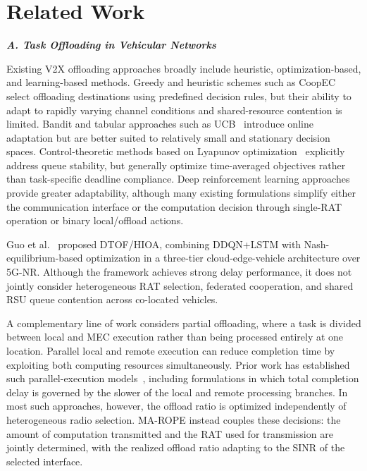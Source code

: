 \section{Related Work}

\textbf{\textit{A. Task Offloading in Vehicular Networks}}

Existing V2X offloading approaches broadly include heuristic, optimization-based, and learning-based methods. Greedy and heuristic schemes such as CoopEC~\cite{shao2025} select offloading destinations using predefined decision rules, but their ability to adapt to rapidly varying channel conditions and shared-resource contention is limited. Bandit and tabular approaches such as UCB~\cite{wu2021} introduce online adaptation but are better suited to relatively small and stationary decision spaces. Control-theoretic methods based on Lyapunov optimization~\cite{jing2019} explicitly address queue stability, but generally optimize time-averaged objectives rather than task-specific deadline compliance. Deep reinforcement learning approaches~\cite{jing2019,yun2022,lowe2017} provide greater adaptability, although many existing formulations simplify either the communication interface or the computation decision through single-RAT operation or binary local/offload actions.

Guo et al.~\cite{guo2026} proposed DTOF/HIOA, combining DDQN+LSTM with Nash-equilibrium-based optimization in a three-tier cloud-edge-vehicle architecture over 5G-NR. Although the framework achieves strong delay performance, it does not jointly consider heterogeneous RAT selection, federated cooperation, and shared RSU queue contention across co-located vehicles.

A complementary line of work considers partial offloading, where a task is divided between local and MEC execution rather than being processed entirely at one location. Parallel local and remote execution can reduce completion time by exploiting both computing resources simultaneously. Prior work has established such parallel-execution models~\cite{mao2017}, including formulations in which total completion delay is governed by the slower of the local and remote processing branches. In most such approaches, however, the offload ratio is optimized independently of heterogeneous radio selection. MA-ROPE instead couples these decisions: the amount of computation transmitted and the RAT used for transmission are jointly determined, with the realized offload ratio adapting to the SINR of the selected interface.

